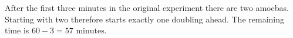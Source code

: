 After the first three minutes in the original experiment there are two amoebas. Starting with two therefore starts exactly one doubling ahead. The remaining time is $60-3=\boxed{57\text{ minutes}}$.

